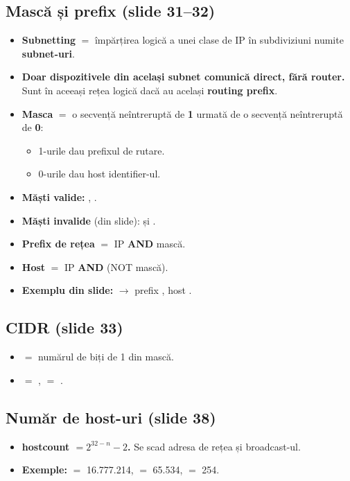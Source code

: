 \documentclass[11pt,a4paper]{article}
\begin{document}
\subsection*{Mască și prefix (slide 31--32)}
\begin{itemize}
  \item \textbf{Subnetting} $=$ împărțirea logică a unei clase de IP în subdiviziuni numite \textbf{subnet-uri}.
  \item \textbf{Doar dispozitivele din același subnet comunică direct, fără router.} Sunt în aceeași rețea logică dacă au același \textbf{routing prefix}.
  \item \textbf{Masca} $=$ o secvență neîntreruptă de \textbf{1} urmată de o secvență neîntreruptă de \textbf{0}:
  \begin{itemize}
    \item 1-urile dau prefixul de rutare.
    \item 0-urile dau host identifier-ul.
  \end{itemize}
  \item \textbf{Măști valide:} , .
  \item \textbf{Măști invalide} (din slide):  și .
  \item \textbf{Prefix de rețea} $=$ IP \textbf{AND} mască.
  \item \textbf{Host} $=$ IP \textbf{AND} (NOT mască).
  \item \textbf{Exemplu din slide:}  $\rightarrow$ prefix , host .
\end{itemize}

\subsection*{CIDR (slide 33)}
\begin{itemize}
  \item {} $=$ numărul de biți de 1 din mască.
  \item {} $=$ ,  $=$ .
\end{itemize}

\subsection*{Număr de host-uri (slide 38)}
\begin{itemize}
  \item \textbf{hostcount $= 2^{32-n} - 2$.} Se scad adresa de rețea și broadcast-ul.
  \item \textbf{Exemple:}  $=$ 16.777.214,  $=$ 65.534,  $=$ 254.
\end{itemize}
\end{document}
